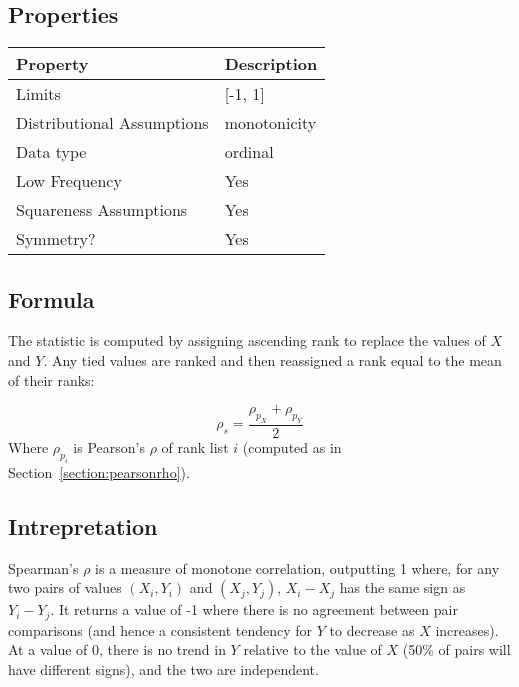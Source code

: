 \documentclass[11pt]{article}
\begin{document}
\subsection{Properties}
\begin{tabular}{| l || l |}
    \hline
    {\bf Property} & {\bf Description} \\
    \hline
    Limits & [-1, 1] \\ \hline

    Distributional Assumptions&  monotonicity \\ \hline

    Data type & ordinal \\ \hline

    Low Frequency & Yes \\ \hline

    Squareness Assumptions & Yes \\ \hline
    
    Symmetry? & Yes \\ \hline

\end{tabular}


\subsection{Formula}
The statistic is computed by assigning ascending rank to replace the values of $X$ and $Y$.  Any tied values are ranked and then reassigned a rank equal to the mean of their ranks: 

$$
\rho_s = \frac{\rho_{p_X} + \rho_{p_Y}}{2}
$$
Where $\rho_{p_i}$ is Pearson's $\rho$ of rank list $i$ (computed as in Section~\ref{section:pearsonrho}).


\subsection{Intrepretation}
Spearman's $\rho$ is a measure of monotone correlation, outputting 1 where, for any two pairs of values $(X_i, Y_i)$ and $(X_j, Y_j)$, $X_i - X_j$ has the same sign as $Y_i - Y_j$.  It returns a value of -1 where there is no agreement between pair comparisons (and hence a consistent tendency for $Y$ to decrease as $X$ increases).  At a value of 0, there is no trend in $Y$ relative to the value of $X$ (50\% of pairs will have different signs), and the two are independent.
\end{document}
